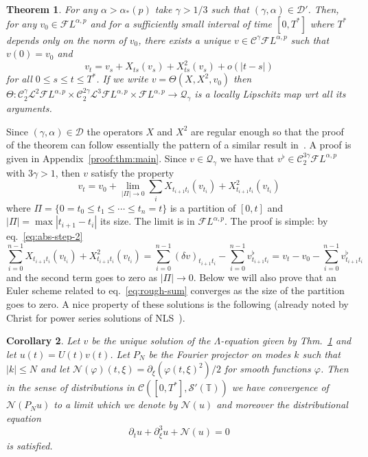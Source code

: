 \documentclass[a4paper,11pt,reqno]{article}
\newcommand{\der}{\delta}
\newcommand{\TT}{\mathbb{T}}
\newcommand{\CC}{\mathcal{C}}
\newcommand{\DD}{\mathcal{D}}
\newcommand{\FF}{\mathcal{F}}
\newcommand{\QQ}{\mathcal{Q}}
\newcommand{\LL}{\mathcal{L}}
\newtheorem{theorem}{Theorem}
\newtheorem{corollary}[theorem]{Corollary}
\begin{document}
\begin{theorem}
\label{thm:main}
For any $\alpha > \alpha_*(p)$ take $\gamma > 1/3$ such that $(\gamma,\alpha) \in \DD'$.
Then, for any
$v_0 \in  \FF L^{\alpha,p}$ and for a sufficiently small interval of time $[0,T^*]$ where $T^*$ depends only on the norm of $v_0$, there exists a unique $v \in \CC^\gamma \FF L^{\alpha,p}$ such that $v(0) = v_0$ and 
$$
v_t = v_s + X_{ts}(v_s) +  X^2_{ts}(v_s) + o(|t-s|)
$$
for all $0\le s\le t \le T^*$.
If we write $v = \Theta(X, X^2,v_0)$ then  
$
\Theta: \CC^\gamma_2 \LL^2 \FF L^{\alpha,p} \times \CC^{2\gamma}_2 \LL^3\FF L^{\alpha,p} \times  \FF L^{\alpha,p} \to \QQ_\gamma
$  is a locally Lipschitz map wrt all its arguments.
\end{theorem}
Since $(\gamma,\alpha)\in\DD$ the operators $X$ and $ X^2$ are regular enough so that the proof of the theorem can
follow essentially the pattern of a similar result
in~\cite{MR2091358}. A proof is given in Appendix~\ref{proof:thm:main}.
Since $v\in\QQ_\gamma$ we have that $v^\flat \in \CC_2^{3\gamma}\FF L^{\alpha,p}$ with $3\gamma > 1$, then $v$ satisfy the property
\begin{equation}
\label{eq:rough-sum}
v_t = v_0 + \lim_{|\Pi|\to 0} \sum_{i} X_{t_{i+1} t_i}(v_{t_i}) +  X^2_{t_{i+1} t_i}(v_{t_i})
\end{equation}
where $\Pi = \{0=t_0\le t_1 \le \cdots \le t_n =t \}$ is a partition of $[0,t]$ and $|\Pi| = \max |t_{i+1}-t_i|$ its size. The limit is in $\FF L^{\alpha,p}$. The proof is simple: by eq.~\eqref{eq:abs-step-2} 
$$
\sum_{i=0}^{n-1} X_{t_{i+1} t_i}(v_{t_i}) +  X^2_{t_{i+1} t_i}(v_{t_i}) = \sum_{i=0}^{n-1} (\der v)_{t_{i+1} t_i} - \sum_{i=0}^{n-1}  v^\flat_{t_{i+1} t_i} = v_t - v_0 - \sum_{i=0}^{n-1}  v^\flat_{t_{i+1} t_i} 
$$
and the second term goes to zero as $|\Pi| \to 0$. Below we will also prove that an Euler scheme related to eq.~\eqref{eq:rough-sum} converges as the size of the partition goes to zero. A nice property of these solutions is the following (already  noted by Christ for power series solutions of NLS~\cite{MR2333210}).

\begin{corollary}
Let $v$ be the unique solution of the $\Lambda$-equation given by Thm.~\ref{thm:main} and let $u(t) = U(t) v(t)$. Let $P_N$ be the Fourier projector on modes $k$ such that $|k|\le N$ and let $\mathcal{N}(\varphi)(t,\xi)=\partial_\xi (\varphi(t,\xi)^2)/2$ for smooth functions $\varphi$. Then  in the sense of distributions in $\CC([0,T^*], \mathcal{S}'(\TT))$ we have convergence of $\mathcal{N}(P_N u)$ to a limit which we denote by 
$\mathcal{N}(u)$ and moreover the distributional equation
$$
\partial_t u + \partial_\xi^3 u +  \mathcal{N}(u) = 0
$$
is satisfied.
\end{corollary}
\end{document}
